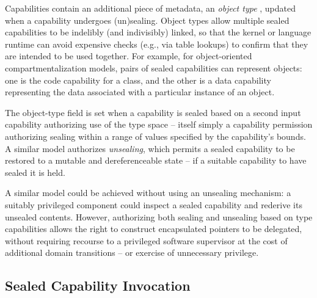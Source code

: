 Capabilities contain an additional piece of metadata, an \textit{object
type}%
%
, updated when a capability undergoes (un)sealing.
Object types allow multiple sealed capabilities to be indelibly (and
indivisibly) linked, so that the kernel or language runtime can avoid
expensive checks (e.g., via table lookups) to confirm that they are intended
to be used together.
%
%
For example, for object-oriented compartmentalization models,
pairs of sealed capabilities can represent
objects: one is the code capability for a class, and the other is a data
capability representing the data associated with a particular instance of an
object.

The object-type field is set when a capability is sealed based on a second
input capability authorizing use of the type space -- itself simply a
capability permission authorizing sealing within a range of values specified
by the capability's bounds.
A similar model authorizes \textit{unsealing}, which permits a sealed
capability to be restored to a mutable and dereferenceable state -- if a
suitable capability to have sealed it is held.

A similar model could be achieved without using an unsealing mechanism: a
suitably privileged component could inspect a sealed capability and rederive
its unsealed contents.
However, authorizing both sealing and unsealing based on type capabilities
allows the right to construct encapsulated pointers to be delegated, without
requiring recourse to a privileged software supervisor at the cost of
additional domain transitions -- or exercise of unnecessary privilege.

\subsection{Sealed Capability Invocation}
\label{sec:model-sealed-capability-invocation}


